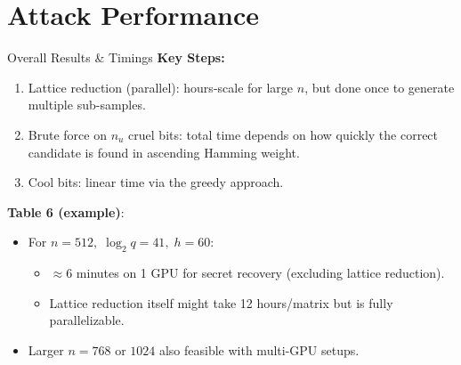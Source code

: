 \documentclass{beamer}
\begin{document}
\section{Attack Performance}
\begin{frame}{Overall Results \& Timings}
  \textbf{Key Steps:}
  \begin{enumerate}
    \item Lattice reduction (parallel): hours-scale for large $n$, but done once to generate multiple sub-samples.
    \item Brute force on $n_u$ cruel bits: total time depends on how quickly the correct candidate is found in ascending Hamming weight.
    \item Cool bits: linear time via the greedy approach.
  \end{enumerate}

  \vspace{0.4cm}
  \textbf{Table 6 (example)}:
  \begin{itemize}
    \item For $n=512,\; \log_2 q=41,\; h=60$:
      \begin{itemize}
        \item $\approx 6$ minutes on 1 GPU for secret recovery (excluding lattice reduction).
        \item Lattice reduction itself might take 12 hours/matrix but is fully parallelizable.
      \end{itemize}
    \item Larger $n=768$ or $1024$ also feasible with multi-GPU setups.
  \end{itemize}
\end{frame}

\end{document}
